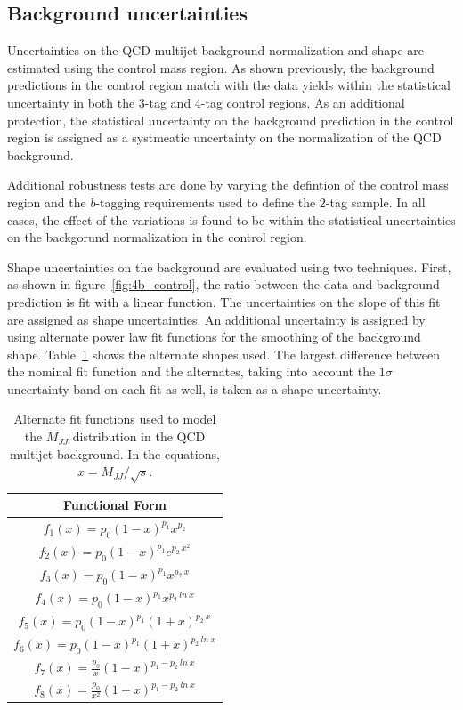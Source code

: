 \subsection{Background uncertainties}

Uncertainties on the QCD multijet background normalization and shape are estimated using the control mass region. As shown previously, the background predictions in the control region match with the data yields within the statistical uncertainty in both the $3$-tag and $4$-tag control regions. As an additional protection, the statistical uncertainty on the background prediction in the control region is assigned as a systmeatic uncertainty on the normalization of the QCD background. 

Additional robustness tests are done by varying the defintion of the control mass region and the $b$-tagging requirements used to define the $2$-tag sample. In all cases, the effect of the variations is found to be within the statistical uncertainties on the backgorund normalization in the control region. 

Shape uncertainties on the background are evaluated using two techniques. First, as shown in figure~\ref{fig:4b_control}, the ratio between the data and background prediction is fit with a linear function. The uncertainties on the slope of this fit are assigned as shape uncertainties. An additional uncertainty is assigned by using alternate power law fit functions for the smoothing of the background shape. Table~\ref{tab:SystFunctions} shows the alternate shapes used. The largest difference between the nominal fit function and the alternates, taking into account the $1\sigma$ uncertainty band on each fit as well, is taken as a shape uncertainty. 

\begin{table}[htbp!]
\begin{center} 
\begin{tabular}{|c|}
\hline
Functional Form \\
\hline
$f_{1}(x) = p_0 (1-x)^{p_1} x^{p_2}$ \\
$f_{2}(x) = p_0 (1-x)^{p_1} e^{p_2\ x^2}$ \\
$f_{3}(x) = p_0 (1-x)^{p_1} x^{p_2\ x}$ \\
$f_{4}(x) = p_0 (1-x)^{p_1} x^{p_2\ ln\ x}$ \\
$f_{5}(x) = p_0 (1-x)^{p_1} (1+x)^{p_2\ x}$ \\
$f_{6}(x) = p_0 (1-x)^{p_1} (1+x)^{p_2\ ln\ x}$ \\
$f_{7}(x) = \frac{p_0}{x} (1-x)^{p_1 - p_2\ ln\ x}$ \\
$f_{8}(x) = \frac{p_0}{x^2} (1-x)^{p_1 - p_2\ ln\ x}$ \\
\hline
\end{tabular}
\caption{Alternate fit functions used to model the $M_{JJ}$ distribution in the QCD multijet background. In the equations, $x = M_{JJ} / \sqrt{s}$.}
\label{tab:SystFunctions}
\end{center}
\end{table}

